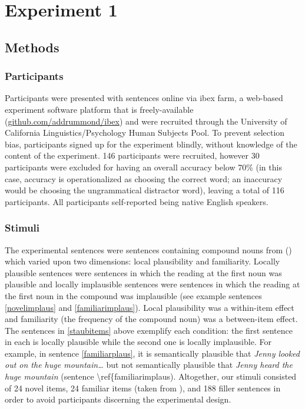 \documentclass[
  12pt,
  letterpaper,
]{scrreport}
\begin{document}
\section{Experiment 1}\label{experiment-1}

\subsection{Methods}\label{methods}

\subsubsection{Participants}\label{participants}

Participants were presented with sentences online via ibex farm, a
web-based experiment software platform that is freely-available
(\url{github.com/addrummond/ibex}) and were recruited through the
University of California Linguistics/Psychology Human Subjects Pool. To
prevent selection bias, participants signed up for the experiment
blindly, without knowledge of the content of the experiment. 146
participants were recruited, however 30 participants were excluded for
having an overall accuracy below 70\% (in this case, accuracy is
operationalized as choosing the correct word; an inaccuracy would be
choosing the ungrammatical distractor word), leaving a total of 116
participants. All participants self-reported being native English
speakers.

\subsubsection{Stimuli}\label{stimuli}

The experimental sentences were sentences containing compound nouns from
()
which varied upon two dimensions: local plausibility and familiarity.
Locally plausible sentences were sentences in which the reading at the
first noun was plausible and locally implausible sentences were
sentences in which the reading at the first noun in the compound was
implausible (see example sentences \ref{novelimplaus} and
\ref{familiarimplaus}). Local plausibility was a within-item effect and
familiarity (the frequency of the compound noun) was a between-item
effect. The sentences in \ref{staubitems} above exemplify each
condition: the first sentence in each is locally plausible while the
second one is locally implausible. For example, in sentence
\ref{familiarplaus}, it is semantically plausible that \emph{Jenny
looked out on the huge mountain\ldots{}} but not semantically plausible
that \emph{Jenny heard the huge mountain} (sentence
\textbackslash ref\{familiarimplaus). Altogether, our stimuli consisted
of 24 novel items, 24 familiar items (taken from
), and
188 filler sentences in order to avoid participants discerning the
experimental design.
\end{document}
